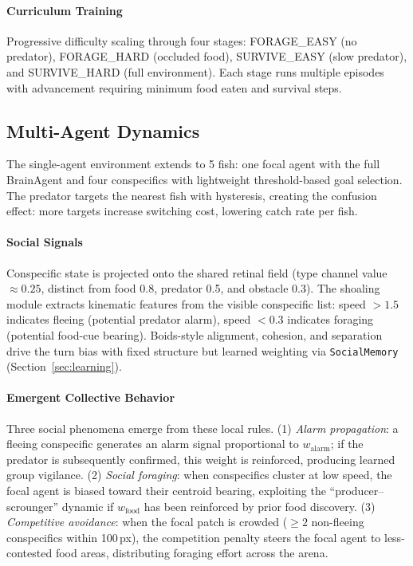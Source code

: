 \documentclass[12pt]{article}
\begin{document}
\paragraph{Curriculum Training}

\begin{sloppypar}
Progressive difficulty scaling through four stages: FORAGE\_EASY
(no predator), FORAGE\_HARD (occluded food), SURVIVE\_EASY (slow
predator), and SURVIVE\_HARD (full environment).
Each stage runs multiple episodes with advancement requiring minimum
food eaten and survival steps.
\end{sloppypar}

\subsection{Multi-Agent Dynamics}\label{sec:multiagent}

The single-agent environment extends to 5 fish: one focal agent
with the full BrainAgent and four conspecifics with lightweight
threshold-based goal selection.
The predator targets the nearest fish with hysteresis, creating the
confusion effect: more targets increase switching cost, lowering
catch rate per fish.

\paragraph{Social Signals}
Conspecific state is projected onto the shared retinal field
(type channel value $\approx 0.25$, distinct from food 0.8,
predator 0.5, and obstacle 0.3).
The shoaling module extracts kinematic features from the visible
conspecific list: speed $>1.5$ indicates fleeing
(potential predator alarm), speed $<0.3$ indicates foraging
(potential food-cue bearing).
Boids-style alignment, cohesion, and separation drive the
turn bias with fixed structure but learned weighting via
\texttt{SocialMemory} (Section~\ref{sec:learning}).

\paragraph{Emergent Collective Behavior}
Three social phenomena emerge from these local rules.
(1) \textit{Alarm propagation}: a fleeing conspecific generates
an alarm signal proportional to $w_\text{alarm}$; if the predator
is subsequently confirmed, this weight is reinforced, producing
learned group vigilance.
(2) \textit{Social foraging}: when conspecifics cluster at low speed,
the focal agent is biased toward their centroid bearing, exploiting
the ``producer--scrounger'' dynamic \citep{barnard1981} if
$w_\text{food}$ has been reinforced by prior food discovery.
(3) \textit{Competitive avoidance}: when the focal patch is crowded
($\geq 2$ non-fleeing conspecifics within 100\,px), the competition
penalty steers the focal agent to less-contested food areas,
distributing foraging effort across the arena.
\end{document}
